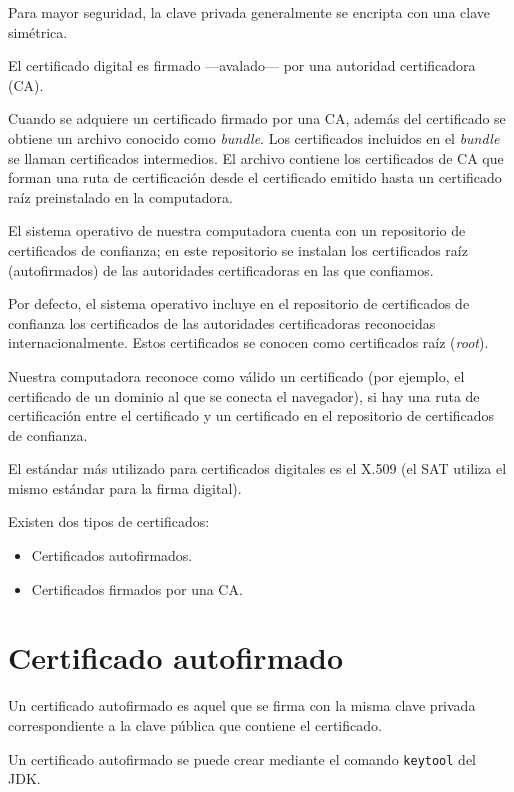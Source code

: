 \documentclass[11pt,a4paper,oneside]{book}
\begin{document}
Para mayor seguridad, la clave privada generalmente se encripta con una clave simétrica.

El certificado digital es firmado —avalado— por una autoridad certificadora (CA).

Cuando se adquiere un certificado firmado por una CA, además del certificado se obtiene un archivo conocido como \emph{bundle}. Los certificados incluidos en el \emph{bundle} se llaman certificados intermedios. El archivo contiene los certificados de CA que forman una ruta de certificación desde el certificado emitido hasta un certificado raíz preinstalado en la computadora.

El sistema operativo de nuestra computadora cuenta con un repositorio de certificados de confianza; en este repositorio se instalan los certificados raíz (autofirmados) de las autoridades certificadoras en las que confiamos.

Por defecto, el sistema operativo incluye en el repositorio de certificados de confianza los certificados de las autoridades certificadoras reconocidas internacionalmente. Estos certificados se conocen como certificados raíz (\emph{root}).

Nuestra computadora reconoce como válido un certificado (por ejemplo, el certificado de un dominio al que se conecta el navegador), si hay una ruta de certificación entre el certificado y un certificado en el repositorio de certificados de confianza.

El estándar más utilizado para certificados digitales es el X.509 (el SAT utiliza el mismo estándar para la firma digital).

Existen dos tipos de certificados:

\begin{itemize}

\item Certificados autofirmados.

\item Certificados firmados por una CA.

\end{itemize}

\section{Certificado autofirmado}

Un certificado autofirmado es aquel que se firma con la misma clave privada correspondiente a la clave pública que contiene el certificado.

Un certificado autofirmado se puede crear mediante el comando \texttt{keytool} del JDK.
\end{document}
